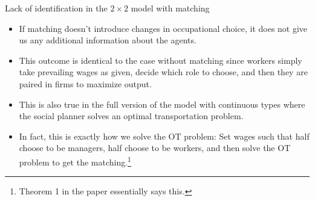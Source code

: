 \documentclass[aspectratio=169]{beamer}
\begin{document}
\begin{frame}{Lack of identification in the $2\times 2$ model with matching}
	\begin{itemize}
		\item If matching doesn't introduce changes in occupational choice, it does not give us any additional information about the agents.
		\smallskip
		\item This outcome is identical to the case without matching since workers simply take prevailing wages as given, decide which role to choose, and then they are paired in firms to maximize output.
		\smallskip
		\item This is also true in the full version of the model with continuous types where the social planner solves an optimal transportation problem.
		\smallskip
		\item In fact, this is exactly how we solve the OT problem: Set wages such that half choose to be managers, half choose to be workers, and then solve the OT problem to get the matching.\footnote{Theorem 1 in the paper essentially says this.}

	\end{itemize}
\end{frame}
		
\end{document}
